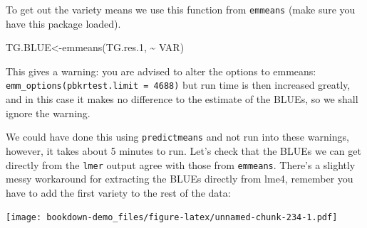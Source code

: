 \documentclass[
]{book}
\newenvironment{Shaded}{\begin{snugshade}}{\end{snugshade}}
\newcommand{\CommentTok}[1]{\textcolor[rgb]{0.56,0.35,0.01}{\textit{#1}}}
\newcommand{\DecValTok}[1]{\textcolor[rgb]{0.00,0.00,0.81}{#1}}
\newcommand{\FloatTok}[1]{\textcolor[rgb]{0.00,0.00,0.81}{#1}}
\newcommand{\FunctionTok}[1]{\textcolor[rgb]{0.00,0.00,0.00}{#1}}
\newcommand{\NormalTok}[1]{#1}
\newcommand{\OtherTok}[1]{\textcolor[rgb]{0.56,0.35,0.01}{#1}}
\newcommand{\SpecialCharTok}[1]{\textcolor[rgb]{0.00,0.00,0.00}{#1}}
\newcommand{\StringTok}[1]{\textcolor[rgb]{0.31,0.60,0.02}{#1}}
\begin{document}
To get out the variety means we use this function from \texttt{emmeans} (make sure you have this package loaded).

\begin{Shaded}
\begin{Highlighting}[]
\NormalTok{TG.BLUE}\OtherTok{\textless{}{-}}\FunctionTok{emmeans}\NormalTok{(TG.res}\FloatTok{.1}\NormalTok{, }\SpecialCharTok{\textasciitilde{}}\NormalTok{ VAR)}
\end{Highlighting}
\end{Shaded}

This gives a warning: you are advised to alter the options to emmeans: \texttt{emm\_options(pbkrtest.limit\ =\ 4688)} but run time is then increased greatly, and in this case it makes no difference to the estimate of the BLUEs, so we shall ignore the warning.

We could have done this using \texttt{predictmeans} and not run into these warnings, however, it takes about 5 minutes to run. Let's check that the BLUEs we can get directly from the \texttt{lmer} output agree with those from \texttt{emmeans}. There's a slightly messy workaround for extracting the BLUEs directly from lme4, remember you have to add the first variety to the rest of the data:

\begin{Shaded}
\end{Shaded}

\texttt{[image: bookdown-demo\_files/figure-latex/unnamed-chunk-234-1.pdf]}
\end{document}
